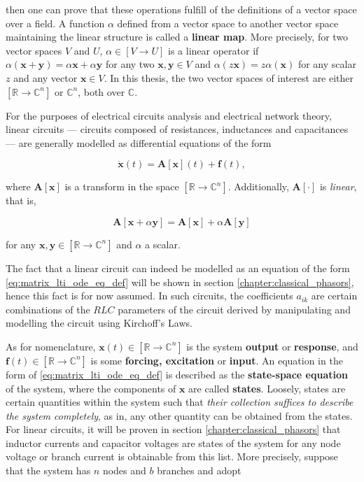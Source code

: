 	\noindent then one can prove that these operations fulfill of the definitions of a vector space over a field. A function $\alpha$ defined from a vector space to another vector space maintaining the linear structure is called a \textbf{linear map}. More precisely, for two vector spaces $V$ and $U$, $\alpha \in\left[V\to U\right]$ is a linear operator if $\alpha\left(\mathbf{x} + \mathbf{y}\right) = \alpha\mathbf{x} + \alpha\mathbf{y}$  for any two $\mathbf{x,y}\in V$ and $\alpha\left(z\mathbf{x}\right) = z\alpha\left(\mathbf{x}\right)$ for any scalar $z$ and any vector $\mathbf{x}\in V$.  In this thesis, the two vector spaces of interest are either $\left[\mathbb{R}\to\mathbb{C}^n\right]$ or $\mathbb{C}^n$, both over $\mathbb{C}$. 

	For the purposes of electrical circuits analysis and electrical network theory, linear circuits — circuits composed of resistances, inductances and capacitances — are generally modelled as differential equations of the form

\begin{equation} \dot{\mathbf{x}}(t) = \mathbf{A}\left[\mathbf{x}\right](t) + \mathbf{f}(t), \label{eq:matrix_lti_ode_eq_def} \end{equation}

	\noindent where $\mathbf{A}\left[\mathbf{x}\right]$ is a transform in the space $\left[\mathbb{R}\to\mathbb{C}^n\right]$. Additionally, $\mathbf{A}\left[\cdot\right]$ is \textit{linear}, that is,

\begin{equation} \mathbf{A}\left[\mathbf{x} + \alpha\mathbf{y}\right] = \mathbf{A}\left[\mathbf{x}\right] + \alpha\mathbf{A}\left[\mathbf{y}\right] \end{equation}

	\noindent for any $\mathbf{x,y}\in\left[\mathbb{R}\to\mathbb{C}^n\right]$ and $\alpha$ a scalar.

	The fact that a linear circuit can indeed be modelled as an equation of the form \eqref{eq:matrix_lti_ode_eq_def} will be shown in section \ref{chapter:classical_phasors}, hence this fact is for now assumed. In such circuits, the coefficients $a_{ik}$ are certain combinations of the $RLC$ parameters of the circuit derived by manipulating and modelling the circuit using Kirchoff's Laws.

	As for nomenclature, $\mathbf{x}(t)\in\left[\mathbb{R}\to\mathbb{C}^n\right]$ is the system \textbf{output} or \textbf{response}, and $\mathbf{f}(t)\in\left[\mathbb{R}\to\mathbb{C}^n\right]$ is some \textbf{forcing, excitation} or \textbf{input}. An equation in the form of \eqref{eq:matrix_lti_ode_eq_def} is described as the \textbf{state-space equation} of the system, where the components of $\mathbf{x}$ are called \textbf{states}. Loosely, states are certain quantities within the system such that \textit{their collection suffices to describe the system completely}, as in, any other quantity can be obtained from the states. For linear circuits, it will be proven in section \ref{chapter:classical_phasors} that inductor currents and capacitor voltages are states of the system for any node voltage or branch current is obtainable from this list. More precisely, suppose that the system has $n$ nodes and $b$ branches and adopt

